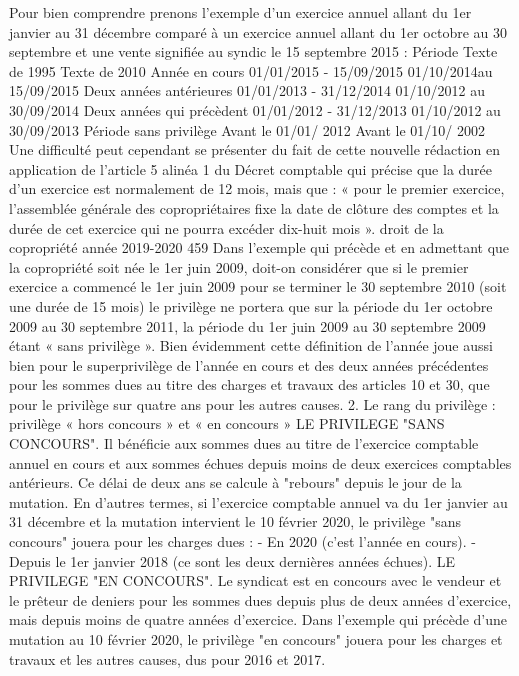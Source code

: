 Pour bien comprendre prenons l’exemple d’un exercice annuel allant du 1er janvier au 31 décembre comparé à un exercice annuel allant du 1er octobre au 30 septembre et une vente signifiée au syndic le 15 septembre 2015 :
Période
Texte de 1995
Texte de 2010
Année en cours
01/01/2015 - 15/09/2015
01/10/2014au 15/09/2015
Deux années antérieures
01/01/2013 - 31/12/2014
01/10/2012 au 30/09/2014
Deux années qui précèdent
01/01/2012 - 31/12/2013
01/10/2012 au 30/09/2013
Période sans privilège
Avant le 01/01/ 2012
Avant le 01/10/ 2002
Une difficulté peut cependant se présenter du fait de cette nouvelle rédaction en application de l’article 5 alinéa 1 du Décret comptable qui précise que la durée d’un exercice est normalement de 12 mois, mais que :
« pour le premier exercice, l’assemblée générale des copropriétaires fixe la date de clôture des comptes et la durée de cet exercice qui ne pourra excéder dix-huit mois ».
droit de la copropriété année 2019-2020
459
Dans l’exemple qui précède et en admettant que la copropriété soit née le 1er juin 2009, doit-on considérer que si le premier exercice a commencé le 1er juin 2009 pour se terminer le 30 septembre 2010 (soit une durée de 15 mois) le privilège ne portera que sur la période du 1er octobre 2009 au 30 septembre 2011, la période du 1er juin 2009 au 30 septembre 2009 étant « sans privilège ».
Bien évidemment cette définition de l’année joue aussi bien pour le superprivilège de l’année en cours et des deux années précédentes pour les sommes dues au titre des charges et travaux des articles 10 et 30, que pour le privilège sur quatre ans pour les autres causes.
2. Le rang du privilège : privilège « hors concours » et « en concours »
LE PRIVILEGE "SANS CONCOURS".
Il bénéficie aux sommes dues au titre de l’exercice comptable annuel en cours et aux sommes échues depuis moins de deux exercices comptables antérieurs. Ce délai de deux ans se calcule à "rebours" depuis le jour de la mutation.
En d'autres termes, si l’exercice comptable annuel va du 1er janvier au 31 décembre et la mutation intervient le 10 février 2020, le privilège "sans concours" jouera pour les charges dues :
- En 2020 (c'est l'année en cours).
- Depuis le 1er janvier 2018 (ce sont les deux dernières années échues).
LE PRIVILEGE "EN CONCOURS".
Le syndicat est en concours avec le vendeur et le prêteur de deniers pour les sommes dues depuis plus de deux années d’exercice, mais depuis moins de quatre années d’exercice.
Dans l'exemple qui précède d'une mutation au 10 février 2020, le privilège "en concours" jouera pour les charges et travaux et les autres causes, dus pour 2016 et 2017.
